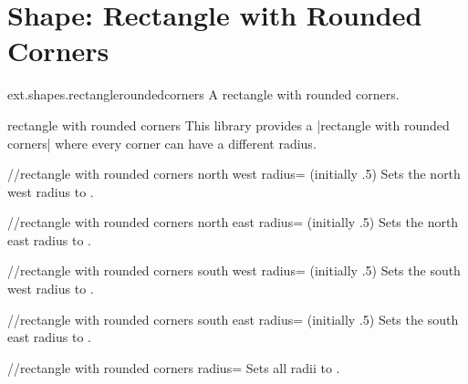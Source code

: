 %
%
%

\section{Shape: Rectangle with Rounded Corners}
\begin{pgflibrary}{ext.shapes.rectangleroundedcorners}
  A rectangle with rounded corners.
\end{pgflibrary}

\begin{ext_shape}{rectangle with rounded corners}
This library provides a |rectangle with rounded corners| where every corner can have a different radius.

\begin{key}{/\pgfext/rectangle with rounded corners north west radius= (initially .5\string\pgflinewidth)}
  Sets the north west radius to .
\end{key}
\begin{key}{/\pgfext/rectangle with rounded corners north east radius= (initially .5\string\pgflinewidth)}
  Sets the north east radius to .
\end{key}
\begin{key}{/\pgfext/rectangle with rounded corners south west radius= (initially .5\string\pgflinewidth)}
  Sets the south west radius to .
\end{key}
\begin{key}{/\pgfext/rectangle with rounded corners south east radius= (initially .5\string\pgflinewidth)}
  Sets the south east radius to .
\end{key}
\begin{key}{/\pgfext/rectangle with rounded corners radius=}
  Sets all radii to .
\end{key}


\end{ext_shape}
